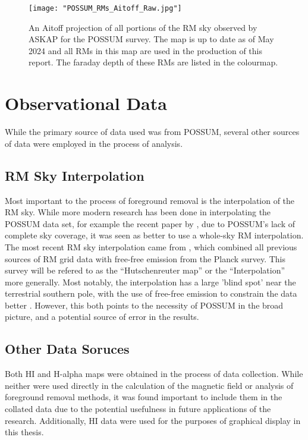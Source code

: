 \begin{figure}
    \texttt{[image: "POSSUM\_RMs\_Aitoff\_Raw.jpg"]}
    \centering
    \caption{An Aitoff projection of all portions of the RM sky observed by ASKAP for the POSSUM survey. The map is up to date as of May 2024 and all RMs in this map are used in the production of this report. The faraday depth of these RMs are listed in the colourmap.}
    \label{fig:rm_map}
\end{figure}

\section{Observational Data}
\label{sec:data}

While the primary source of data used was from POSSUM, several other sources of data were employed in the process of analysis.

\subsection{RM Sky Interpolation}
\label{ssec:legacy}

Most important to the process of foreground removal is the interpolation of the RM sky. While more modern research has been done in interpolating the POSSUM data set, for example the recent paper by \cite{ID58}, due to POSSUM's lack of complete sky coverage, it was seen as better to use a whole-sky RM interpolation. The most recent RM sky interpolation came from \cite{ID44, ID45}, which combined all previous sources of RM grid data with free-free emission from the Planck survey. This survey will be refered to as the “Hutschenreuter map” or the “Interpolation” more generally. Most notably, the interpolation has a large 'blind spot' near the terrestrial southern pole, with the use of free-free emission to constrain the data better \citep{ID44, ID45}. However, this both points to the necessity of POSSUM in the broad picture, and a potential source of error in the results.

\subsection{Other Data Soruces}
\label{ssec:other_data}

Both HI and H-alpha maps were obtained in the process of data collection. While neither were used directly in the calculation of the magnetic field or analysis of foreground removal methods, it was found important to include them in the collated data due to the potential usefulness in future applications of the research. Additionally, HI data were used for the purposes of graphical display in this thesis.


